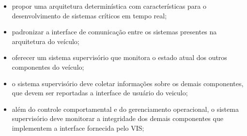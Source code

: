\documentclass[conference]{IEEEtran}
\begin{document}
\begin{itemize}
	\item propor uma arquitetura determinística com características para o desenvolvimento de sistemas críticos em tempo real;
	\item padronizar a interface de comunicação entre os sistemas presentes na arquitetura do veículo;
	\item oferecer um sistema supervisório que monitora o estado atual dos outros componentes do veículo;
	\item o sistema supervisório deve coletar informações sobre os demais componentes, que devem ser reportadas a interface de usuário do veiculo;
	\item além do controle comportamental e do gerenciamento operacional, o sistema supervisório deve monitorar a integridade dos demais componentes que implementem a interface fornecida pelo VIS;

	
	
	
\end{itemize}


\end{document}
